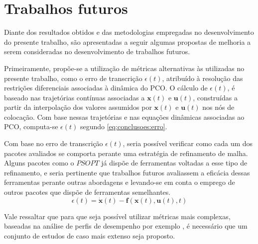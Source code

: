 \section{Trabalhos futuros}

Diante dos resultados obtidos e das metodologias empregadas no desenvolvimento do presente trabalho, são apresentadas a seguir algumas propostas de melhoria a serem consideradas no desenvolvimento de trabalhos futuros. 

Primeiramente, propõe-se a utilização de métricas alternativas às utilizadas no presente trabalho, como o erro de transcrição $ \epsilon(t) $, atribuído à resolução das restrições diferenciais associadas à dinâmica do PCO. O cálculo de $ \epsilon(t) $, é baseado nas trajetórias contínuas associadas a $ \mathbf{x}(t) $ e $ \mathbf{u}(t) $, construídas a partir da interpolação dos valores assumidos por $ \mathbf{x}(t) $ e $ \mathbf{u}(t) $ nos nós de colocação. Com base nessas trajetórias e nas equações dinâmicas associadas ao PCO, computa-se $ \epsilon(t) $ segundo \eqref{eq:conclusoes:erro}. 

Com base no erro de transcrição $ \epsilon(t) $, seria possível verificar como cada um dos pacotes avaliados se comporta perante uma estratégia de refinamento de malha. Alguns pacotes como o $ PSOPT $ já dispõe de ferramentas voltadas a esse tipo de refinamento, e seria pertinente que trabalhos futuros avaliassem a eficácia dessas ferramentas perante outras abordagens e levando-se em conta o emprego de outros pacotes que dispõe de ferramentas semelhantes. 
%
\begin{equation}
	\label{eq:conclusoes:erro}
	\epsilon(t) = \mathbf{\dot{x}}(t) - \mathbf{f}(\mathbf{x}(t), \mathbf{u}(t), t)
\end{equation}

Vale ressaltar que para que seja possível utilizar métricas mais complexas, baseadas na análise de perfis de desempenho por exemplo \cite{dolan_benchmarking_2002}, é necessário que um conjunto de estudos de caso mais extenso seja proposto.

